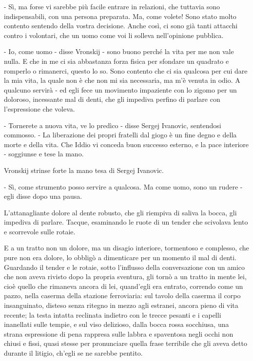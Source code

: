 - Sì, ma forse vi sarebbe più facile entrare in relazioni, che tuttavia sono indispensabili, con una persona preparata. Ma, come volete! Sono stato molto contento sentendo della vostra decisione. Anche così, ci sono già tanti attacchi contro i volontari, che un uomo come voi li solleva nell'opinione pubblica. 

- Io, come uomo - disse Vronskij - sono buono perché la vita per me non vale nulla. E che in me ci sia abbastanza forza fisica per sfondare un quadrato e romperlo o rimanerci, questo lo so. Sono contento che ci sia qualcosa per cui dare la mia vita, la quale non è che non mi sia necessaria, ma m'è venuta in odio. A qualcuno servirà - ed egli fece un movimento impaziente con lo zigomo per un doloroso, incessante mal di denti, che gli impediva perfino di parlare con l'espressione che voleva. 

- Tornerete a nuova vita, ve lo predìco - disse Sergej Ivanovic, sentendosi commosso. - La liberazione dei propri fratelli dal giogo è un fine degno e della morte e della vita. Che Iddio vi conceda buon successo esterno, e la pace interiore - soggiunse e tese la mano. 

Vronskij strinse forte la mano tesa di Sergej Ivanovic. 

- Sì, come strumento posso servire a qualcosa. Ma come uomo, sono un rudere - egli disse dopo una pausa. 

L'attanagliante dolore al dente robusto, che gli riempiva di saliva la bocca, gli impediva di parlare. Tacque, esaminando le ruote di un tender che scivolava lento e scorrevole sulle rotaie. 

E a un tratto non un dolore, ma un disagio interiore, tormentoso e complesso, che pure non era dolore, lo obbligò a dimenticare per un momento il mal di denti. Guardando il tender e le rotaie, sotto l'influsso della conversazione con un amico che non aveva rivisto dopo la propria sventura, gli tornò a un tratto in mente lei, cioè quello che rimaneva ancora di lei, quand'egli era entrato, correndo come un pazzo, nella caserma della stazione ferroviaria: sul tavolo della caserma il corpo insanguinato, disteso senza ritegno in mezzo agli estranei, ancora pieno di vita recente; la testa intatta reclinata indietro con le trecce pesanti e i capelli inanellati sulle tempie, e sul viso delizioso, dalla bocca rossa socchiusa, una strana espressione di pena rappresa sulle labbra e spaventosa negli occhi non chiusi e fissi, quasi stesse per pronunciare quella frase terribile che gli aveva detto durante il litigio, ch'egli se ne sarebbe pentito. 

